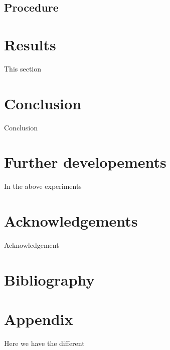 \documentclass[a4paper,11pt]{article}
\begin{document}
		\subsection{Procedure}
			


		\section{Results}

			\label{sec:results}
		
			\hspace{2cm} This section 
			
			
			
		\clearpage
		\section{Conclusion}
		 	\begin{description}
		 	\item \hspace{2cm} Conclusion
		 	\end{description}
		 	
		\section{Further developements}
		\begin{description}
			\item \hspace{2cm} In the above experiments 
		\end{description}
		 	
		 	
		 \clearpage
		 \section{Acknowledgements}
		 
		  		Acknowledgement
		 
		 	\clearpage
		 	\section{Bibliography}
		
		
		\clearpage
  		\section{Appendix}
  		 	Here we have the different 
\end{document}
